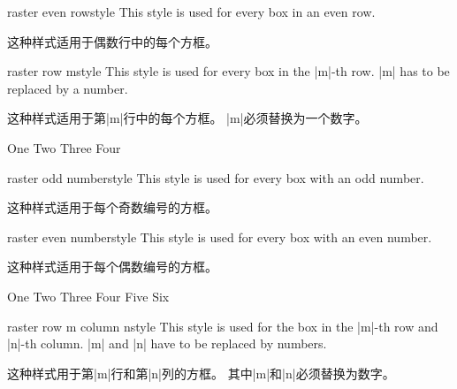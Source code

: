 \begin{docTcbKey}[][doc new=2014-11-10]{raster even row}{}{style}
This style is used for every box in an even row.

这种样式适用于偶数行中的每个方框。
\end{docTcbKey}


\begin{docTcbKey}[][doc new=2014-11-10]{raster row m}{}{style}
This style is used for every box in the |m|-th row.
|m| has to be replaced by a number.

这种样式适用于第|m|行中的每个方框。 |m|必须替换为一个数字。
\begin{dispExample}
\begin{tcbitemize}[size=small,colframe=red!50!black,colback=red!10!white,
raster row 2/.style={colframe=blue!50!black,colback=blue!10!white}]
\tcbitem One
\tcbitem Two
\tcbitem Three
\tcbitem Four
\end{tcbitemize}
\end{dispExample}
\end{docTcbKey}

\begin{docTcbKey}[][doc new=2014-11-10]{raster odd number}{}{style}
This style is used for every box with an odd number.

这种样式适用于每个奇数编号的方框。
\end{docTcbKey}

\begin{docTcbKey}[][doc new=2014-11-10]{raster even number}{}{style}
This style is used for every box with an even number.

这种样式适用于每个偶数编号的方框。
\begin{dispExample}
\begin{tcbitemize}[size=small,colframe=red!50!black,colback=red!10!white,
raster columns=3,
raster even number/.style={colframe=blue!50!black,colback=blue!10!white}]
\tcbitem One
\tcbitem Two
\tcbitem Three
\tcbitem Four
\tcbitem Five
\tcbitem Six
\end{tcbitemize}
\end{dispExample}
\end{docTcbKey}


\begin{docTcbKey}[][doc new=2014-11-10]{raster row m column n}{}{style}
This style is used for the box in the
|m|-th row and |n|-th column.
|m| and |n| have to be replaced by numbers.

这种样式用于第|m|行和第|n|列的方框。 其中|m|和|n|必须替换为数字。
\end{docTcbKey}


